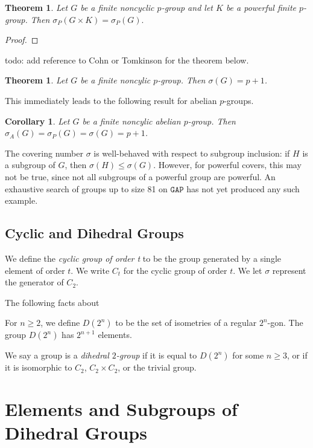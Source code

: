 \documentclass{amsart}
\numberwithin{equation} {section}
\newtheorem{theorem}[equation]{Theorem}
\newtheorem{corollary}[equation]{Corollary}
\theoremstyle{definition}
\begin{document}
\begin{theorem}
Let $G$ be a finite noncyclic $p$-group and let $K$ be a powerful finite $p$-group. Then $\sigma_P(G \times K) = \sigma_P(G).$
\end{theorem}

\begin{proof}

\end{proof}

todo: add reference to Cohn or Tomkinson for the theorem below. 

\begin{theorem}\label{t:covering-number-doesnt-change-abelian} 
Let $G$ be a finite noncylic $p$-group. Then $\sigma(G) =  p + 1$.
\end{theorem}

This immediately leads to the following result for abelian $p$-groups. 

\begin{corollary}
Let $G$ be a finite noncylic abelian $p$-group. Then $\sigma_{A}(G) = \sigma_P(G) = \sigma(G) = p+1$.
\end{corollary}

The covering number $\sigma$ is well-behaved with respect to subgroup inclusion: if $H$ is a subgroup of $G$, then $\sigma(H) \leq \sigma(G)$. However, for powerful covers, this may not be true, since not all subgroups of a powerful group are powerful. An exhaustive search of groups up to size 81 on $\texttt{GAP}$ has not yet produced any such example.


\subsection{Cyclic and Dihedral Groups}

We define the \textit{cyclic group of order t} to be the group generated by a single element of order $t$. We write $C_t$ for the cyclic group of order $t$. We let $\sigma$ represent the generator of $C_2$. 

The following facts about 

For $n \geq 2$, we define $D(2^n)$ to be the set of isometries of a regular $2^n$-gon. The group $D(2^n)$ has $2^{n+1}$ elements. 

We say a group is a  \textit{dihedral $2$-group} if it is equal to $D(2^n)$ for some $n \geq 3$, or if it is isomorphic to $C_2$, $C_2 \times C_2$, or the trivial group. 


\section{Elements and Subgroups of Dihedral Groups}
\end{document}
